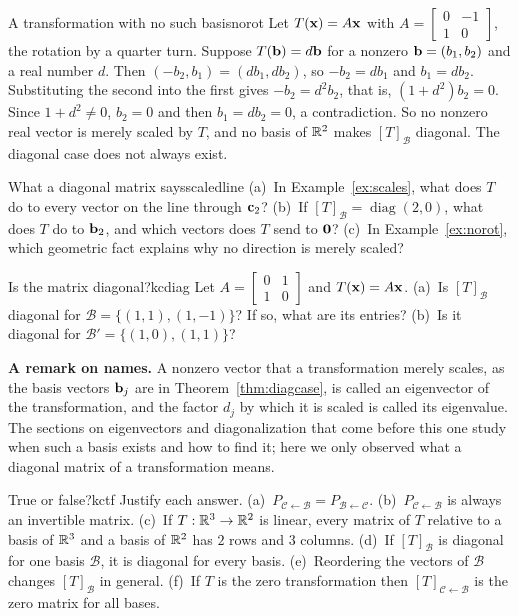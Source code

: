 \documentclass[11pt]{article}
\begin{document}
\begin{exmp}{A transformation with no such basis}{norot}
Let $T(\mathbf{x})=A\mathbf{x}$ with $A=\begin{bmatrix}0&-1\\1&0\end{bmatrix}$, the rotation by a quarter turn. Suppose $T(\mathbf{b})=d\mathbf{b}$ for a nonzero $\mathbf{b}=(b_1,b_2)$ and a real number $d$. Then $(-b_2,b_1)=(db_1,db_2)$, so $-b_2=db_1$ and $b_1=db_2$. Substituting the second into the first gives $-b_2=d^2b_2$, that is, $(1+d^2)b_2=0$. Since $1+d^2\neq0$, $b_2=0$ and then $b_1=db_2=0$, a contradiction. So no nonzero real vector is merely scaled by $T$, and no basis of $\mathbb{R}^2$ makes $[T]_{\mathcal{B}}$ diagonal. The diagonal case does not always exist.
\end{exmp}

\begin{think}{What a diagonal matrix says}{scaledline}
(a)~In Example~\ref{ex:scales}, what does $T$ do to every vector on the line through $\mathbf{c}_2$? (b)~If $[T]_{\mathcal{B}}=\operatorname{diag}(2,0)$, what does $T$ do to $\mathbf{b}_2$, and which vectors does $T$ send to $\mathbf{0}$? (c)~In Example~\ref{ex:norot}, which geometric fact explains why no direction is merely scaled?
\end{think}

\begin{kc}{Is the matrix diagonal?}{kcdiag}
Let $A=\begin{bmatrix}0&1\\1&0\end{bmatrix}$ and $T(\mathbf{x})=A\mathbf{x}$. (a)~Is $[T]_{\mathcal{B}}$ diagonal for $\mathcal{B}=\{(1,1),(1,-1)\}$? If so, what are its entries? (b)~Is it diagonal for $\mathcal{B}'=\{(1,0),(1,1)\}$?
\end{kc}

\noindent\textbf{A remark on names.} A nonzero vector that a transformation merely scales, as the basis vectors $\mathbf{b}_j$ are in Theorem~\ref{thm:diagcase}, is called an eigenvector of the transformation, and the factor $d_j$ by which it is scaled is called its eigenvalue. The sections on eigenvectors and diagonalization that come before this one study when such a basis exists and how to find it; here we only observed what a diagonal matrix of a transformation means.

\begin{kc}{True or false?}{kctf}
Justify each answer. (a)~$P_{\mathcal{C}\leftarrow\mathcal{B}}=P_{\mathcal{B}\leftarrow\mathcal{C}}$. (b)~$P_{\mathcal{C}\leftarrow\mathcal{B}}$ is always an invertible matrix. (c)~If $T:\mathbb{R}^3\to\mathbb{R}^2$ is linear, every matrix of $T$ relative to a basis of $\mathbb{R}^3$ and a basis of $\mathbb{R}^2$ has $2$ rows and $3$ columns. (d)~If $[T]_{\mathcal{B}}$ is diagonal for one basis $\mathcal{B}$, it is diagonal for every basis. (e)~Reordering the vectors of $\mathcal{B}$ changes $[T]_{\mathcal{B}}$ in general. (f)~If $T$ is the zero transformation then $[T]_{\mathcal{C}\leftarrow\mathcal{B}}$ is the zero matrix for all bases.
\end{kc}
\end{document}
